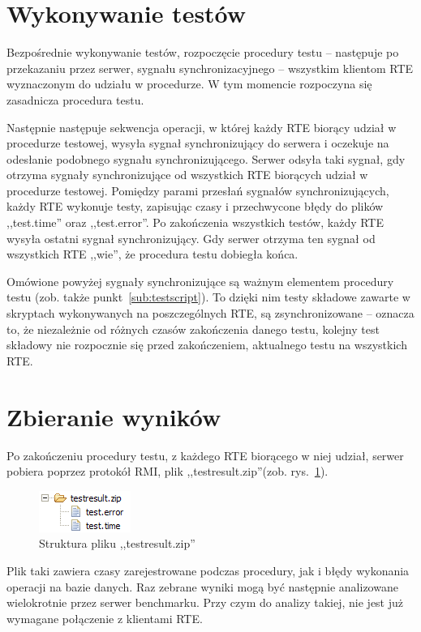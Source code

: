 \section{Wykonywanie testów}
Bezpośrednie wykonywanie testów, rozpoczęcie procedury testu -- następuje po przekazaniu
przez serwer, sygnału synchronizacyjnego -- wszystkim klientom RTE wyznaczonym do udziału w procedurze.
W tym momencie rozpoczyna się zasadnicza procedura testu.

Następnie następuje sekwencja operacji, w której każdy RTE biorący udział w procedurze testowej,
wysyła sygnał synchronizujący do serwera i oczekuje na odesłanie podobnego sygnału synchronizującego. 
Serwer odsyła taki sygnał, gdy otrzyma  sygnały synchronizujące od wszystkich RTE biorących udział w procedurze testowej.
Pomiędzy parami przesłań sygnałów synchronizujących, każdy RTE wykonuje testy, 
zapisując czasy i przechwycone błędy do plików ,,test.time'' oraz ,,test.error''.
Po zakończenia wszystkich testów, każdy RTE wysyła ostatni sygnał synchronizujący. 
Gdy serwer otrzyma ten sygnał od wszystkich RTE ,,wie'', że procedura testu dobiegła końca.
	
Omówione powyżej sygnały synchronizujące są ważnym elementem procedury testu (zob. także punkt~\ref{sub:testscript}). 
To dzięki nim testy składowe zawarte w skryptach wykonywanych na poszczególnych RTE,
są zsynchronizowane -- oznacza to, że niezależnie od różnych czasów zakończenia danego testu,
kolejny test składowy nie rozpocznie się przed zakończeniem, aktualnego testu na wszystkich RTE.

\section{Zbieranie wyników}
Po zakończeniu procedury testu, z każdego RTE biorącego w  niej udział, serwer pobiera poprzez protokół RMI, 
plik ,,testresult.zip''(zob. rys.~\ref{rys:testresultzip}).
\begin{figure}[h]
\begin{center}
\includegraphics[width=0.3\linewidth]{figures/testresultzip.png}
\end{center}
\caption{Struktura pliku ,,testresult.zip''}\label{rys:testresultzip}
\end{figure}
Plik taki zawiera czasy zarejestrowane podczas procedury, jak i błędy wykonania
operacji na bazie danych. Raz zebrane wyniki mogą być następnie analizowane wielokrotnie
przez serwer benchmarku. Przy czym do analizy takiej, nie jest już wymagane połączenie
z klientami RTE.

